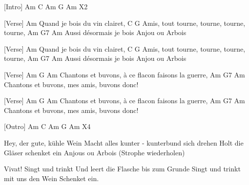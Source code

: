 [Intro]
Am C Am G Am  X2

[Verse]
Am
Quand je bois du vin clairet,
            C                       G
Amis, tout tourne, tourne, tourne, tourne,
 Am                           G7   Am
Aussi désormais je bois Anjou ou Arbois

[Verse]
Am
Quand je bois du vin clairet,
            C                       G
Amis, tout tourne, tourne, tourne, tourne,
 Am                           G7   Am
Aussi désormais je bois Anjou ou Arbois

[Verse]
 Am                    G                   Am
Chantons et buvons, à ce flacon faisons la guerre,
 Am                            G7     Am
Chantons et buvons, mes amis, buvons donc!

[Verse]
 Am                    G                   Am
Chantons et buvons, à ce flacon faisons la guerre,
 Am                            G7     Am
Chantons et buvons, mes amis, buvons donc!

[Outro]
Am C Am G Am  X4

Hey, der gute, kühle Wein
Macht alles kunter - kunterbund sich drehen
Holt die Gläser schenket ein
Anjous ou Arbois
(Strophe wiederholen)

Vivat! Singt und trinkt
Und leert die Flasche bis zum Grunde
Singt und trinkt mit uns den Wein
Schenket ein.
